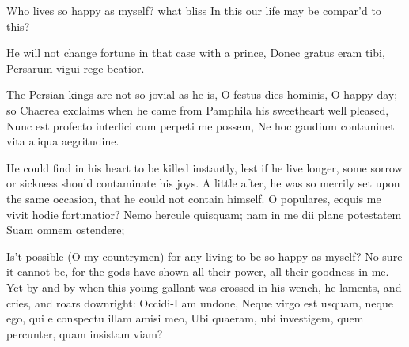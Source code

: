 {Who lives so happy as myself? what bliss
In this our life may be compar'd to this?

He will not change fortune in that case with a prince,
Donec gratus eram tibi,
Persarum vigui rege beatior.

The Persian kings are not so jovial as he is, O festus dies
hominis, O happy day; so Chaerea exclaims when he came from Pamphila
his sweetheart well pleased,
Nunc est profecto interfici cum perpeti me possem,
Ne hoc gaudium contaminet vita aliqua aegritudine.

He could find in his heart to be killed instantly, lest if he live
longer, some sorrow or sickness should contaminate his joys. A little
after, he was so merrily set upon the same occasion, that he could not
contain himself.
O populares, ecquis me vivit hodie fortunatior?
Nemo hercule quisquam; nam in me dii plane potestatem
Suam omnem ostendere;

Is't possible (O my countrymen) for any living to be so happy as
myself? No sure it cannot be, for the gods have shown all their power,
all their goodness in me. Yet by and by when this young gallant was
crossed in his wench, he laments, and cries, and roars downright:
Occidi-I am undone,
Neque virgo est usquam, neque ego, qui e conspectu illam amisi meo,
Ubi quaeram, ubi investigem, quem percunter, quam insistam viam?

}
